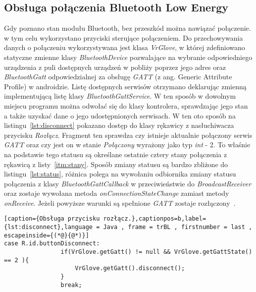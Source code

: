 	\subsection{Obsługa połączenia Bluetooth Low Energy}
	\label{subsec:ble}
	Gdy poznano stan modułu Bluetooth, bez przeszkód można nawiązać połączenie. w tym celu wykorzystano przyciski sterujące połączeniem. Do przechowywania danych o połączeniu wykorzystywana jest klasa \textit{VrGlove}, w której zdefiniowano statyczne zmienne klasy \textit{BluetoothDevice} pozwalające na wybranie odpowiedniego urządzenia z puli dostępnych urządzeń w pobliży poprzez jego adres oraz \textit{BluetoothGatt} odpowiedzialnej za obsługę \textit{GATT} (z ang. Generic Attribute Profile) w androidzie. Listę dostępnych serwisów otrzymano deklarując zmienną implementującą listę klasy  \textit{BluetoothGattService}. W ten sposób w dowolnym miejscu programu można odwołać się do klasy kontrolera, sprawdzając jego stan a także uzyskać dane o jego udostępnionych serwisach. W ten oto sposób na listingu~\ref{lst:disconnect} pokazano dostęp do klasy rękawicy z nasłuchiwacza przycisku \textit{Rozłącz}. Fragment ten sprawdza czy istnieje aktualnie połączony serwis \textit{GATT} oraz czy jest on w stanie \textit{Połączony} wyrażony jako typ \textit{int} - 2. To właśnie na podstawie tego statusu są określane ostatnie cztery stany połączenia z rękawicą z listy~\ref{itm:stany}. Sposób zmiany statusu są bardzo zbliżone do listingu~\ref{lst:status}, różnica polega na wywołaniu odbiornika zmiany statusu połączenia z klasy \textit{BluetoothGattCallback} w przeciwieństwie do \textit{BroadcastReceiver} oraz zostaje wywołana metoda \textit{onConnectionStateChange} zamiast metody \textit{onReceive}. Jeżeli powyższe warunki są spełnione \textit{GATT} zostaje rozłączony~\cite{AndroidDoc}. 
\begin{lstlisting}[caption={Obsługa przycisku rozłącz.},captionpos=b,label={lst:disconnect},language = Java , frame = trBL , firstnumber = last , escapeinside={(*@}{@*)}]
case R.id.buttonDisconnect:
                if(VrGlove.getGatt() != null && VrGlove.getGattState() == 2 ){
                    VrGlove.getGatt().disconnect();
                }
                break;                    
\end{lstlisting}	
